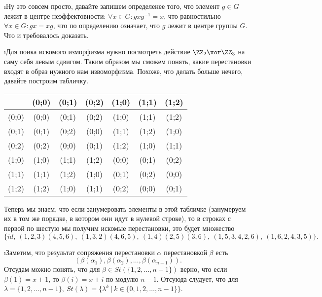 \i Ну это совсем просто, давайте запишем определенее того, что элемент $g \in G$ лежит в центре неэффектовности: $\forall x \in G: gxg^{-1} = x$, что равностильно $\forall x \in G: gx = xg$, что по определению означает, что $g$ лежит в центре группы $G$. Что и требовалось доказать.


\i Для поика искомого изморфизма нужно посмотреть действие $\ZZ_2 \xor \ZZ_3$ на саму себя левым сдвигом. Таким образом мы сможем понять, какие перестановки входят в образ нужного нам извоморфизма. Похоже, что делать больше нечего, давайте построим табличку.
\begin{center}
    \begin{tabular}{|c||c|c|c|c|c|c|}
         \hline
               & (0;0) & (0;1) & (0;2) & (1;0) & (1;1) & (1;2)\\
         \hline \hline
         (0;0) & (0;0) & (0;1) & (0;2) & (1;0) & (1;1) & (1;2)\\
         \hline
         (0;1) & (0;1) & (0;2) & (0;0) & (1;1) & (1;2) & (1;0)\\
         \hline
         (0;2) & (0;2) & (0;0) & (0;1) & (1;2) & (1;0) & (1;1)\\
         \hline
         (1;0) & (1;0) & (1;1) & (1;2) & (0;0) & (0;1) & (0;2)\\
         \hline
         (1;1) & (1;1) & (1;2) & (1;0) & (0;1) & (0;2) & (0;0)\\
         \hline
         (1;2) & (1;2) & (1;0) & (1;1) & (0;2) & (0;0) & (0;1)\\
         \hline
    \end{tabular}
\end{center}
Теперь мы знаем, что если занумеровать элементы в этой табличке (занумеруем их в том же порядке, в котором они идут в нулевой строке), то в строках с первой по шестую мы получим искомые перестановки, это будет множество $$\{id,\ (1,2,3)(4,5,6),\ (1,3,2)(4,6,5),\ (1,4)(2,5)(3,6),\ (1,5,3,4,2,6),\ (1,6,2,4,3,5)\}.$$

\i Заметим, что результат сопряжения перестановки $\alpha$ перестановкой $\beta$ есть $$(\beta(\alpha_1), \beta(\alpha_2), \ldots, \beta(\alpha_{n-1})).$$
Отсудам можно понять, что для $\beta \in St(\{1, 2, \ldots, n-1\})$ верно, что если $\beta(1) = x+1$, то $\beta(i) = x+i$ по модулю $n-1$. Отсуюда слудует, что для $\lambda = \{1, 2, \ldots, n-1\},\ St(\lambda) = \{\lambda^k \ | \ k \in \{0, 1, 2, \ldots, n-1\}\}$.
